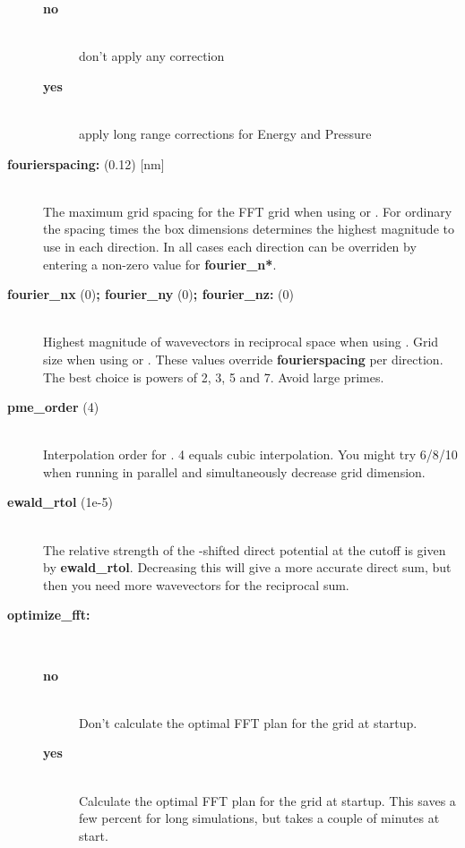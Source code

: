 \begin{description}
\vspace{-2ex}\begin{description}
\item[{\bf no}]\mbox{}\\
don't apply any correction
\item[{\bf yes}]\mbox{}\\
apply long range  corrections for Energy and Pressure
\end{description}
\item[{\bf fourierspacing: }(0.12) {[nm]}]\mbox{}\\
The maximum grid spacing for the FFT grid when using  or .
For ordinary  the spacing times the box dimensions determines the
highest magnitude to use in each direction. In all cases
each direction can be overriden by entering a non-zero value for
{\bf fourier\_n*}. 
\item[{\bf fourier\_nx }(0){\bf  ; fourier\_ny }(0){\bf  ; fourier\_nz: }(0)]\mbox{}\\
Highest magnitude of wavevectors in reciprocal space when using .
Grid size when using  or . These values override
{\bf fourierspacing} per direction. The best choice is powers of
2, 3, 5 and 7. Avoid large primes.
\item[{\bf pme\_order }(4)]\mbox{}\\
Interpolation order for . 4 equals cubic interpolation. You might try
6/8/10 when running in parallel and simultaneously decrease grid dimension.
\item[{\bf ewald\_rtol }(1e-5)]\mbox{}\\
The relative strength of the -shifted direct potential at the cutoff
is given by {\bf ewald\_rtol}. Decreasing this will give a more accurate
direct sum, but then you need more wavevectors for the reciprocal sum.
\item[{\bf optimize\_fft:}]\mbox{}\\
\vspace{-2ex}\begin{description}
\item[{\bf no}]\mbox{}\\
Don't calculate the optimal FFT plan for the grid at startup.
\item[{\bf yes}]\mbox{}\\
Calculate the optimal FFT plan for the grid at startup. This saves a
few percent for long simulations, but takes a couple of minutes
at start.
\end{description}
\end{description}

